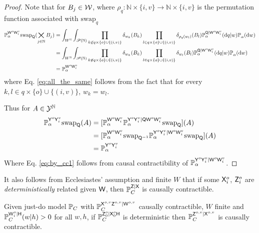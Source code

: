 \begin{proof}
Note that for $B_j\in \mathcal{W}$, where $\rho_q:\mathbb{N}\times\{i,v\}\to \mathbb{N}\times\{i,v\}$ is the permutation function associated with $\text{swap}_{q}$
\begin{align}
    \mathbb{P}_\alpha^{\mathsf{W}^o\mathsf{W}^v_i}\text{swap}_{\mathsf{Q}} (\bigtimes_{j\in\mathbb{N}} B_j) &= \int_{W^{\mathbb{N}}}\int_{\mathscr{P}(\mathbb{N})} \prod_{k\not\in q\times\{o\}\cup\{(i,v)\}} \delta_{w_k}(B_k) \prod_{l\in q\times\{o\}\cup\{(i,v)\}} \delta_{\rho_q(w_l)} (B_l) \mathbb{P}_\alpha^{\mathsf{Q}|\mathsf{W}^o\mathsf{W}^v_i}(\mathrm{d}q|w)\mathbb{P}_\alpha^{}(\mathrm{d}w)\\
    &= \int_{W^{\mathbb{N}}}\int_{\mathscr{P}(\mathbb{N})} \prod_{k\not\in q\times\{o\}\cup\{(i,v)\}} \delta_{w_k}(B_k) \prod_{l\in q\times\{o\}\cup\{(i,v)\}} \delta_{w_l} (B_l) \mathbb{P}_\alpha^{\mathsf{Q}|\mathsf{W}^o\mathsf{W}^v_i}(\mathrm{d}q|w)\mathbb{P}_\alpha^{}(\mathrm{d}w)\label{eq:all_the_same}\\
    &= \mathbb{P}_\alpha^{\mathsf{W}^o\mathsf{W}^v_i}
\end{align}
where Eq. \ref{eq:all_the_same} follows from the fact that for every $k,l\in q\times\{o\}\cup\{(i,v)\}$, $w_k=w_l$.

Thus for $A\in \mathcal{Y}^{\mathbb{N}}$
\begin{align}
    \mathbb{P}_\alpha^{\mathsf{Y}^{o}\mathsf{Y}^v_i}\text{swap}_{\mathsf{Q}}(A) &= [\mathbb{P}_\alpha^{\mathsf{W}^o\mathsf{W}^v_i} \mathbb{P}_\alpha^{\mathsf{Y}^{o}\mathsf{Y}^v_i|\mathsf{Q}\mathsf{W}^o\mathsf{W}^v_i}\text{swap}_{\mathsf{Q}}](A)\\
    &= [\mathbb{P}_\alpha^{\mathsf{W}^o\mathsf{W}^v_i} \text{swap}_{\mathsf{Q}^{-1}} \mathbb{P}_\alpha^{\mathsf{Y}^{o}\mathsf{Y}^v_i|\mathsf{W}^o\mathsf{W}^v_i}\text{swap}_{\mathsf{Q}}](A)\\
    &= \mathbb{P}_\alpha^{\mathsf{Y}^{o}\mathsf{Y}^v_i}\label{eq:by_cc1}
\end{align}
Where Eq. \ref{eq:by_cc1} follows from causal contractibility of $\mathbb{P}_\alpha^{\mathsf{Y}^{o}\mathsf{Y}^v_i|\mathsf{W}^o\mathsf{W}^v_i}$.
\end{proof}

It also follows from Ecclesiastes' assumption and finite $W$ that if some $\mathsf{X}_i^o$, $\mathsf{Z}_i^o$ are \emph{deterministically} related given $\mathsf{W}$, then $\mathbb{P}_C^{\mathsf{Z}|\mathsf{X}}$ is causally contractible.

\begin{theorem}\label{th:det_obs_to_cons}
Given just-do model $\mathbb{P}_C$ with $\mathbb{P}_C^{\mathsf{X}^{o,v}\mathsf{Z}^{o,v}|\mathsf{W}^{o,v}}$ causally contractible, $W$ finite and $\mathbb{P}_C^{\mathsf{W}^o_i|\mathsf{H}}(w|h)>0$ for all $w,h$, if $\mathbb{P}_C^{\mathsf{Z}^o_0|\mathsf{X}^o_0\mathsf{H}}$ is deterministic then $\mathbb{P}_C^{\mathsf{Z}^{o,v}|\mathsf{X}^{o,v}}$ is causally contractible.
\end{theorem}

